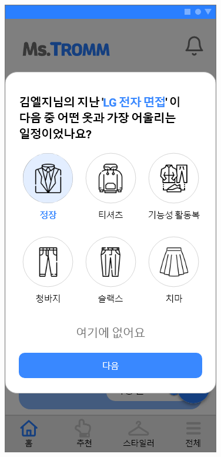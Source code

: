 \documentclass[conference]{IEEEtran}
\begin{document}
\begin{enumerate}
        \begin{itemize}
        \centerline{\includegraphics[scale=0.24]{assets/학습 팝업2.png}
}
\end{itemize}
\end{enumerate}
\end{document}

